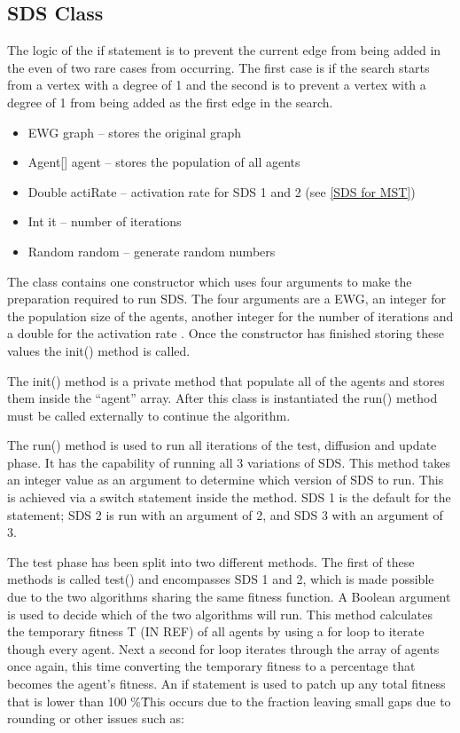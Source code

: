\documentclass{AISB2008}
\begin{document}
\subsection{SDS Class}

The logic of the if statement is to prevent the current edge from being added in the even of two rare cases from occurring. The first case is if the search starts from a vertex with a degree of 1 and the second is to prevent a vertex with a degree of 1 from being added as the first edge in the search.

\begin{itemize}
\item EWG graph – stores the original graph
\item Agent[] agent – stores the population of all agents
\item Double actiRate – activation rate for SDS 1 and 2 (see \ref{SDS for MST})
\item Int it – number of iterations
\item Random random – generate random numbers
\end{itemize}

The class contains one constructor which uses four arguments to make the preparation required to run SDS. The four arguments are a EWG, an integer for the population size of the agents, another integer for the number of iterations and a double for the activation rate . Once the constructor has finished storing these values the init() method is called.

The init() method is a private method that populate all of the agents and stores them inside the “agent” array. After this class is instantiated the run() method must be called externally to continue the algorithm.

The run() method is used to run all iterations of the test, diffusion and update phase. It has the capability of running all 3 variations of SDS. This method takes an integer value as an argument to determine which version of SDS to run. This is achieved via a switch statement inside the method. SDS 1 is the default for the statement; SDS 2 is run with an argument of 2, and SDS 3 with an argument of 3.

The test phase has been split into two different methods.  The first of these methods is called test() and encompasses SDS 1 and 2, which is made possible due to the two algorithms sharing the same fitness function.  A Boolean argument is used to decide which of the two algorithms will run. This method calculates the temporary fitness T (IN REF) of all agents by using a for loop to iterate though every agent. Next a second for loop iterates through the array of agents once again, this time converting the temporary fitness to a percentage that becomes the agent’s fitness. An if statement is used to patch up any total fitness that is lower than 100 \%\. This occurs due to the fraction leaving small gaps due to rounding or other issues such as:
\end{document}
